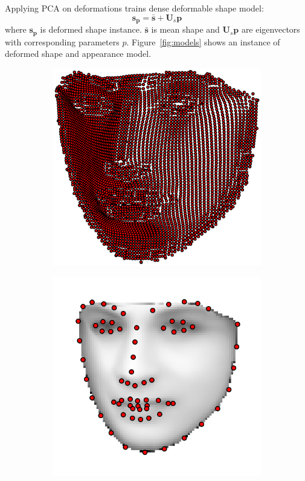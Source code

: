 Applying PCA on deformations trains dense deformable shape model:
\begin{equation*}
    \bm{s_p}=\bm{\bar{s}} + \bm{U}_s\bm{p}
\end{equation*}
where $\bm{s_p}$ is deformed shape instance. $\bm{\bar{s}}$ is mean shape and $\bm{U}_s\bm{p}$ are eigenvectors with corresponding parameters $p$. Figure~\ref{fig:models} shows an instance of deformed shape and appearance model.
\begin{figure}[h!]
    \centering
    \begin{subfigure}[b]{0.22\textwidth}
            \includegraphics[width=\textwidth]{resources/Fig_dAAM/of_shape}
    \end{subfigure}
  	\hfill
    \begin{subfigure}[b]{0.22\textwidth}
            \includegraphics[width=\textwidth]{resources/Fig_dAAM/of_app}

\end{subfigure}
\end{figure}
